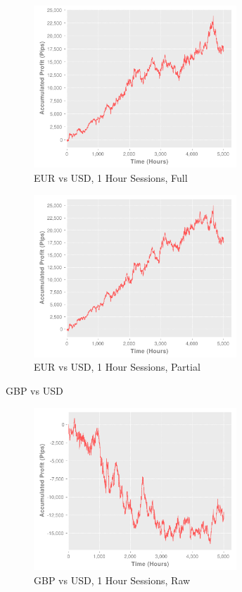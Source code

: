 \documentclass[letterpaper]{article}
\begin{document}
\begin{figure}[!t]
  \centering
  \includegraphics[width=3.0in]{eurusd60-of}
  \caption{EUR vs USD, 1 Hour Sessions, Full}
  \label{eurusd60-of}
\end{figure}

\begin{figure}[!t]
  \centering
  \includegraphics[width=3.0in]{eurusd60-op}
  \caption{EUR vs USD, 1 Hour Sessions, Partial}
  \label{eurusd60-op}
\end{figure}

GBP vs USD

\begin{figure}[!t]
  \centering
  \includegraphics[width=3.0in]{gbpusd60-r}
  \caption{GBP vs USD, 1 Hour Sessions, Raw}
  \label{gbpusd60-r}
\end{figure}
\end{document}
